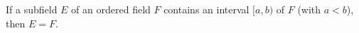 If a subfield $E$ of an ordered field $F$ contains an interval $[a, b)$ of $F$ (with $a < b$), then $E = F$.